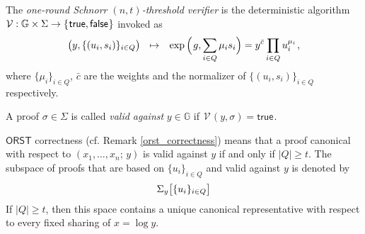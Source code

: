 \documentclass{iacrtrans}
\begin{document}
\begin{defn}\label{orst_verifier}
The \textit{one-round Schnorr $(n, t)$-threshold verifier}
is the deterministic algorithm
$\mathcal{V}: \mathbb{G} \times \Sigma \rightarrow
\{\hspace{0.5pt}\textsf{true}, \textsf{false}\hspace{0.5pt}\}$
invoked as
\vspace{5pt}
\begin{equation*}
\big(y, \{(u_i, s_i)\}_{i \in Q}\big)\
\ \mapsto
\ \hspace{4pt}\exp\Big(\hspace{1pt}g, {\sum_{i \in Q} \mu_i s_i}\Big) =
y ^ {\bar{c}} \prod_{i \in Q} u_i^{\mu_i}
\hspace{1pt},
\vspace{5pt}
\end{equation*}
where $\{\mu_i\}_{i \in Q}$, $\bar{c}$ are
the weights and the normalizer of $\{(u_i, s_i)\}_{i \in Q}$
respectively.
\end{defn}

\begin{defn}\label{orst_validity_definition}
A proof $\sigma \in \Sigma$ is called
\textit{valid against} $y \in \mathbb{G}$ if
$\hspace{1pt}\mathcal{V}\hspace{1pt}(y, \sigma)
= \textsf{true}\hspace{1pt}$.
\end{defn}

\noindent
$\mathsf{ORST}$ correctness
(cf. Remark \ref{orst_correctness})
means that a proof canonical with respect
to $(x_1, \dots, x_n;\hspace{2pt} y)$
is valid against $y$ if and only if $|Q| \ge t$.
The subspace of proofs that are based on
$\{u_i\}_{i \in Q}$ and valid against $y$ is denoted by
\vspace{5pt}
\begin{equation*}\label{orst_valid_proofs_on_commitments_def}
\Sigma_y \big[\{u_i\}_{i \in Q}\big]
\vspace{5pt}
\end{equation*}
If $|Q| \ge t$, then this space
contains a unique canonical representative
with respect to every fixed sharing of $x = \log y$.
\end{document}
